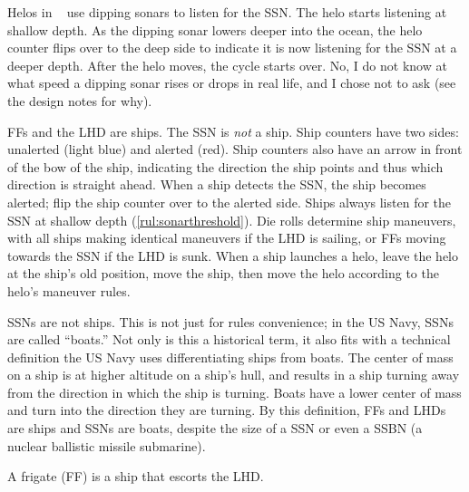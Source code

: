 \documentclass[../TacSubMicroRules.tex]{subfiles}
\begin{document}
\begin{design}
    Helos in \gametitle~ use dipping sonars to listen for the SSN.
    The helo starts listening at shallow depth.
    As the dipping sonar lowers deeper into the ocean, the helo counter flips over to the deep side to indicate it is now listening for the SSN at a deeper depth.
    After the helo moves, the cycle starts over.
    No, I do not know at what speed a dipping sonar rises or drops in real life, and I chose not to ask (see the design notes for why).
\end{design}

 FFs and the LHD are ships.
The SSN is \emph{not} a ship.
Ship counters have two sides: unalerted (light blue) and alerted (red).
Ship counters also have an arrow in front of the bow of the ship, indicating the direction the ship points and thus which direction is straight ahead.
When a ship detects the SSN, the ship becomes alerted; flip the ship counter over to the alerted side.
Ships always listen for the SSN at shallow depth (\ref{rul:sonarthreshold}).
Die rolls determine ship maneuvers, with all ships making identical maneuvers if the LHD is sailing, or FFs moving towards the SSN if the LHD is sunk.
When a ship launches a helo, leave the helo at the ship's old position, move the ship, then move the helo according to the helo's maneuver rules.

\begin{design}
    SSNs are not ships.
    This is not just for rules convenience; in the US Navy, SSNs are called ``boats.''
    Not only is this a historical term, it also fits with a technical definition the US Navy uses differentiating ships from boats.
    The center of mass on a ship is at higher altitude on a ship's hull, and results in a ship turning away from the direction in which the ship is turning.
    Boats have a lower center of mass and turn into the direction they are turning.
    By this definition, FFs and LHDs are ships and SSNs are boats, despite the size of a SSN or even a SSBN (a nuclear ballistic missile submarine).
\end{design}

 A frigate (FF) is a ship that escorts the LHD.
\end{document}
